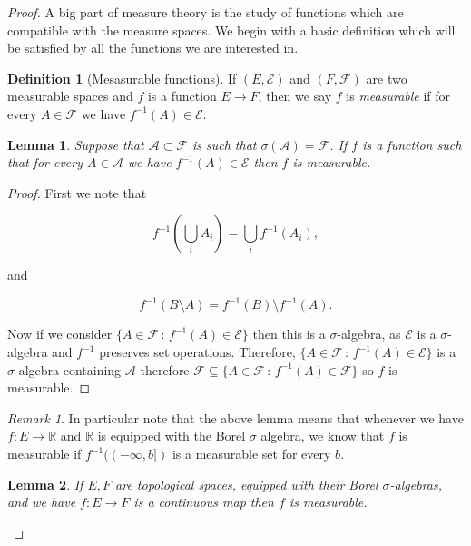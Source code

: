 \documentclass[
]{book}
\newtheorem{lemma}{Lemma}[chapter]
\theoremstyle{definition}
\newtheorem{definition}{Definition}[chapter]
\theoremstyle{definition}
\theoremstyle{definition}
\theoremstyle{definition}
\theoremstyle{remark}
\newtheorem*{remark}{Remark}
\begin{document}
\begin{proof}
A big part of measure theory is the study of functions which are compatible with the measure spaces. We begin with a basic definition which will be satisfied by all the functions we are interested in.

\begin{definition}[Mesasurable functions]
If \((E, \mathcal{E})\) and \((F, \mathcal{F})\) are two measurable spaces and \(f\) is a function \(E \rightarrow F\), then we say \(f\) is \emph{measurable} if for every \(A \in \mathcal{F}\) we have \(f^{-1}(A) \in \mathcal{E}\).
\end{definition}

\begin{lemma}
Suppose that \(\mathcal{A} \subset \mathcal{F}\) is such that \(\sigma(\mathcal{A})= \mathcal{F}\). If \(f\) is a function such that for every \(A \in \mathcal{A}\) we have \(f^{-1}(A) \in \mathcal{E}\) then \(f\) is measurable.
\end{lemma}

\begin{proof}
First we note that

\[ f^{-1}\left( \bigcup_i A_i \right) = \bigcup_i f^{-1}(A_i), \]

and

\[ f^{-1}(B \setminus A) = f^{-1}(B) \setminus f^{-1}(A). \]

Now if we consider \(\{ A \in \mathcal{F} \, :\, f^{-1}(A) \in \mathcal{E}\}\) then this is a \(\sigma\)-algebra, as \(\mathcal{E}\) is a \(\sigma\)-algebra and \(f^{-1}\) preserves set operations. Therefore, \(\{ A \in \mathcal{F} \, :\, f^{-1}(A) \in \mathcal{E}\}\) is a \(\sigma\)-algebra containing \(\mathcal{A}\) therefore \(\mathcal{F} \subseteq \{ A \in \mathcal{F} \, :\, f^{-1}(A) \in \mathcal{F}\}\) so \(f\) is measurable.
\end{proof}

\begin{remark}
In particular note that the above lemma means that whenever we have \(f: E \rightarrow \mathbb{R}\) and \(\mathbb{R}\) is equipped with the Borel \(\sigma\) algebra, we know that \(f\) is measurable if \(f^{-1}((-\infty, b])\) is a measurable set for every \(b\).
\end{remark}

\begin{lemma}
If \(E, F\) are topological spaces, equipped with their Borel \(\sigma\)-algebras, and we have \(f:E \rightarrow F\) is a continuous map then \(f\) is measurable.
\end{lemma}


\end{proof}
\end{document}
